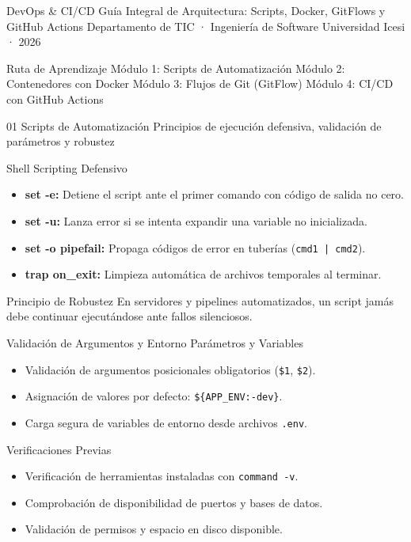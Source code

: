 \documentclass[aspectratio=169]{beamer}
\begin{document}
\titleSlideSplit
  {DevOps \& CI/CD}
  {Guía Integral de Arquitectura: Scripts, Docker, GitFlows y GitHub Actions}
  {Departamento de TIC · Ingeniería de Software}
  {Universidad Icesi · 2026}

\agendaSlideCards
  {Ruta de Aprendizaje}
  {Módulo 1: Scripts de Automatización}
  {Módulo 2: Contenedores con Docker}
  {Módulo 3: Flujos de Git (GitFlow)}
  {Módulo 4: CI/CD con GitHub Actions}

\sectionSlideStripe
  {01}
  {Scripts de Automatización}
  {Principios de ejecución defensiva, validación de parámetros y robustez}

\contentSlideBulletCard
  {Shell Scripting Defensivo}
  {
    \begin{itemize}
      \item \textbf{set -e:} Detiene el script ante el primer comando con código de salida no cero.
      \item \textbf{set -u:} Lanza error si se intenta expandir una variable no inicializada.
      \item \textbf{set -o pipefail:} Propaga códigos de error en tuberías (\texttt{cmd1 | cmd2}).
      \item \textbf{trap on\_exit:} Limpieza automática de archivos temporales al terminar.
    \end{itemize}
  }
  {Principio de Robustez}
  {En servidores y pipelines automatizados, un script jamás debe continuar ejecutándose ante fallos silenciosos.}

\contentSlideTwoCols
  {Validación de Argumentos y Entorno}
  {Parámetros y Variables}
  {
    \begin{itemize}
      \item Validación de argumentos posicionales obligatorios (\texttt{\$1}, \texttt{\$2}).
      \item Asignación de valores por defecto: \texttt{\$\{APP\_ENV:-dev\}}.
      \item Carga segura de variables de entorno desde archivos \texttt{.env}.
    \end{itemize}
  }
  {Verificaciones Previas}
  {
    \begin{itemize}
      \item Verificación de herramientas instaladas con \texttt{command -v}.
      \item Comprobación de disponibilidad de puertos y bases de datos.
      \item Validación de permisos y espacio en disco disponible.
    \end{itemize}
  }
\end{document}

